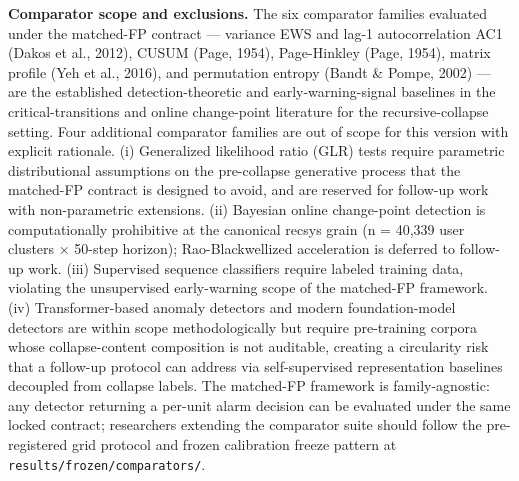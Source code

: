 \documentclass[
  11pt,
]{article}
\begin{document}
\textbf{Comparator scope and exclusions.} The six comparator families
evaluated under the matched-FP contract --- variance EWS and lag-1
autocorrelation AC1 (Dakos et al., 2012), CUSUM (Page, 1954),
Page-Hinkley (Page, 1954), matrix profile (Yeh et al., 2016), and
permutation entropy (Bandt \& Pompe, 2002) --- are the established
detection-theoretic and early-warning-signal baselines in the
critical-transitions and online change-point literature for the
recursive-collapse setting. Four additional comparator families are out
of scope for this version with explicit rationale. (i) Generalized
likelihood ratio (GLR) tests require parametric distributional
assumptions on the pre-collapse generative process that the matched-FP
contract is designed to avoid, and are reserved for follow-up work with
non-parametric extensions. (ii) Bayesian online change-point detection
is computationally prohibitive at the canonical recsys grain (n = 40,339
user clusters × 50-step horizon); Rao-Blackwellized acceleration is
deferred to follow-up work. (iii) Supervised sequence classifiers
require labeled training data, violating the unsupervised early-warning
scope of the matched-FP framework. (iv) Transformer-based anomaly
detectors and modern foundation-model detectors are within scope
methodologically but require pre-training corpora whose collapse-content
composition is not auditable, creating a circularity risk that a
follow-up protocol can address via self-supervised representation
baselines decoupled from collapse labels. The matched-FP framework is
family-agnostic: any detector returning a per-unit alarm decision can be
evaluated under the same locked contract; researchers extending the
comparator suite should follow the pre-registered grid protocol and
frozen calibration freeze pattern at
\texttt{results/frozen/comparators/}.
\end{document}
